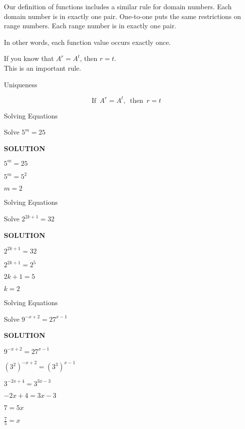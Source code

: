 \documentclass{ximera}
\begin{document}
Our definition of functions includes a similar rule for domain numbers.  Each domain number is in exactly one pair.  One-to-one puts the same restrictions on range numbers.  Each range number is in exactly one pair.

In other words, each function value occurs exactly once.


If you know that $A^r = A^t$, then $r=t$. \\


This is an important rule.


\begin{fact} Uniqueness


\[     \text{If } \,  A^r = A^t, \,  \text{ then }  \, r=t    \]


\end{fact}




\begin{example} Solving Equations


Solve $5^m = 25$


\textbf{\textcolor{purple!50!blue!90!black}{SOLUTION}}


$5^m = 25$

$5^m = 5^2$

$m = 2$

\end{example}










\begin{example} Solving Equations


Solve $2^{2k+1} = 32$


\textbf{\textcolor{purple!50!blue!90!black}{SOLUTION}}


$2^{2k+1} = 32$

$2^{2k+1} = 2^5$

$2k + 1 = 5$

$k = 2$

\end{example}






\begin{example} Solving Equations


Solve $9^{-x + 2} = 27^{x-1}$


\textbf{\textcolor{purple!50!blue!90!black}{SOLUTION}}


$9^{-x + 2} = 27^{x-1}$

$(3^2)^{-x + 2} = (3^3)^{x-1}$

$3^{-2x+4} = 3^{3x-3}$

$-2x + 4 = 3x - 3$

$7 = 5x$


$\frac{7}{5} = x$

\end{example}
\end{document}
